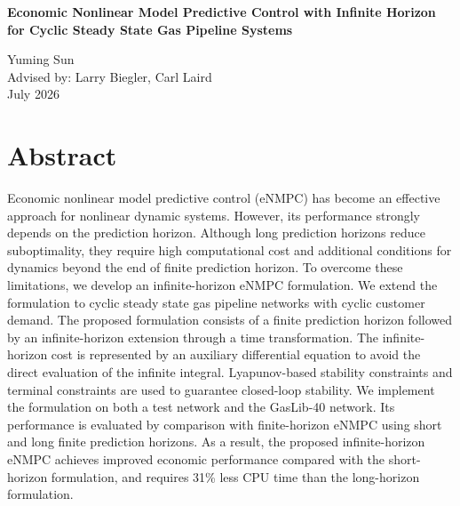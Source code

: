 \documentclass[11pt]{article}
\begin{document}
\begin{center}
\begingroup
{}
{\Large\bfseries
Economic Nonlinear Model Predictive Control with Infinite Horizon for Cyclic Steady State Gas Pipeline Systems\par}

\vspace{10pt}

{\normalsize
Yuming Sun\\[1pt]
Advised by: Larry Biegler, Carl Laird\\[1pt]
July 2026\par}
\endgroup
\end{center}

\vspace{-30pt}

\setcounter{secnumdepth}{0}
\section{Abstract}
\setcounter{secnumdepth}{2}

Economic nonlinear model predictive control (eNMPC) has become an effective approach for nonlinear dynamic systems. However, its performance strongly depends on the prediction horizon. Although long prediction horizons reduce suboptimality, they require high computational cost and additional conditions for dynamics beyond the end of finite prediction horizon. To overcome these limitations, we develop an infinite-horizon eNMPC formulation. We extend the formulation to cyclic steady state gas pipeline networks with cyclic customer demand. The proposed formulation consists of a finite prediction horizon followed by an infinite-horizon extension through a time transformation. The infinite-horizon cost is represented by an auxiliary differential equation to avoid the direct evaluation of the infinite integral. Lyapunov-based stability constraints and terminal constraints are used to guarantee closed-loop stability. We implement the formulation on both a test network and the GasLib-40 network. Its performance is evaluated by comparison with finite-horizon eNMPC using short and long finite prediction horizons. As a result, the proposed infinite-horizon eNMPC achieves improved economic performance compared with the short-horizon formulation, and requires 31\% less CPU time than the long-horizon formulation.
\end{document}
